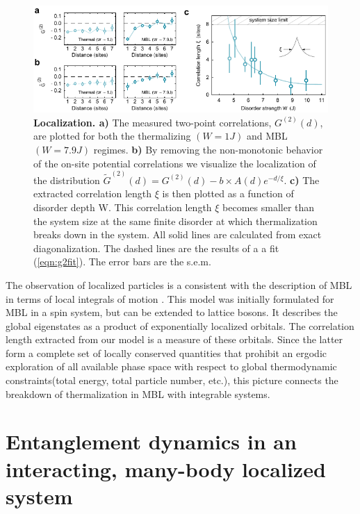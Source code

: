 \begin{figure}[t!]
		\includegraphics[width=\columnwidth]{figures/ch5/figure3_editv2edit.pdf} 
		\caption{\textbf{Localization. a)} The measured two-point correlations, $G^{(2)}(d)$, are plotted for both the thermalizing $(W=1J)$ and MBL $(W=7.9J)$ regimes. \textbf{b)} By removing the non-monotonic behavior of the on-site potential correlations we visualize the localization of the distribution $\tilde{G}^{(2)}(d) = G^{(2)}(d) - b\times A(d) e^{-d/\xi}$. \textbf{c)} The extracted correlation length $\xi$ is then plotted as a function of disorder depth W. This correlation length $\xi$ becomes smaller than the system size at the same finite disorder at which thermalization breaks down in the system. All solid lines are calculated from exact diagonalization. The dashed lines are the results of a a fit (\ref{eqn:g2fit}). The error bars are the s.e.m.}
		\label{fig:ch5fig3}	
\end{figure}

The observation of localized particles is a consistent with the description of MBL in terms of local integrals of motion \cite{Serbyn2013a,Serbyn2013b,Huse2014}. This model was initially formulated for MBL in a spin system, but can be extended to lattice bosons. It describes the global eigenstates as a product of exponentially localized orbitals. The correlation length extracted from our model is a measure of these orbitals. Since the latter form a complete set of locally conserved quantities that prohibit an ergodic exploration of all available phase space with respect to global thermodynamic constraints(total energy, total particle number, etc.), this picture connects the breakdown of thermalization in MBL with integrable systems.

\section{Entanglement dynamics in an interacting, many-body localized system}

